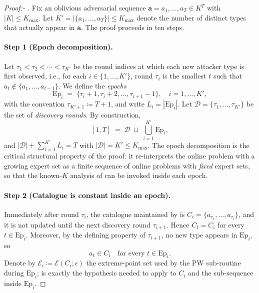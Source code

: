 \documentclass[letterpaper,9pt,twocolumn]{extarticle}
\newcommand{\avec}{\mathbf{a}}
\newcommand{\cE}{\mathcal{E}}
\newcommand{\Kmax}{K_{\max}}
\theoremstyle{plain}
\theoremstyle{definition}
\theoremstyle{remark}
\begin{document}
\begin{proof}[Proof:- ]
Fix an oblivious adversarial sequence $\avec=a_1,\dots,a_T\in K^T$ with
$|K|\le\Kmax$. Let $K'=|\{a_1,\dots,a_T\}|\le\Kmax$ denote the number of
distinct types that actually appear in $\avec$. The proof proceeds in ten
steps.

\paragraph{Step 1 (Epoch decomposition).}
Let $\tau_1<\tau_2<\cdots<\tau_{K'}$ be the round indices at which each
new attacker type is first observed, i.e., for each
$i\in\{1,\dots,K'\}$, round $\tau_i$ is the smallest $t$ such that
$a_t\notin\{a_1,\dots,a_{t-1}\}$. We define the \emph{epochs}
\begin{equation}
\mathrm{Ep}_i\;=\;\{\tau_i+1,\tau_i+2,\dots,\tau_{i+1}-1\},\quad
i=1,\dots,K',
\label{eq:epoch-def}
\end{equation}
with the convention $\tau_{K'+1}\coloneqq T+1$, and write
$L_i=|\mathrm{Ep}_i|$. Let
$\mathcal{D}=\{\tau_1,\dots,\tau_{K'}\}$ be the set of \emph{discovery
rounds}. By construction,
\[
[1,T]\;=\;\mathcal{D}\;\sqcup\;\bigcup_{i=1}^{K'}\mathrm{Ep}_i,
\]
and
$|\mathcal{D}|+\sum_{i=1}^{K'}L_i=T$ with $|\mathcal{D}|=K'\le\Kmax$. The
epoch decomposition is the critical structural property of the proof: it
re-interprets the online problem with a growing expert set as a finite
sequence of online problems with \emph{fixed} expert sets, so that the
known-$K$ analysis of \citet{balcan2015} can be invoked inside each
epoch.

\paragraph{Step 2 (Catalogue is constant inside an epoch).}
Immediately after round $\tau_i$, the catalogue maintained by
 is $C_i=\{a_{\tau_1},\dots,a_{\tau_i}\}$, and it is not
updated until the next discovery round $\tau_{i+1}$. Hence $C_t=C_i$ for
every $t\in\mathrm{Ep}_i$. Moreover, by the defining property of
$\tau_{i+1}$, no new type appears in $\mathrm{Ep}_i$, so
\begin{equation}
a_t\in C_i\quad\text{for every }t\in\mathrm{Ep}_i.
\label{eq:epoch-types}
\end{equation}
Denote by $\cE_i\coloneqq\cE(C_i;\epsilon)$ the extreme-point set
used by the PW sub-routine during $\mathrm{Ep}_i$; 
is exactly the hypothesis needed to apply  to $C_i$ and the
sub-sequence inside $\mathrm{Ep}_i$.


\end{proof}
\end{document}
